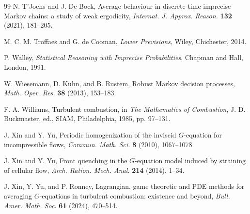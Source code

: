 \documentclass[11pt,reqno,noamsfonts]{amsart}
\theoremstyle{definition}
\theoremstyle{remark}
\begin{document}
\begin{thebibliography}{99}
N. T'Joens and J. De Bock,
Average behaviour in discrete time imprecise Markov chains: a study of weak ergodicity,
\emph{Internat. J. Approx. Reason.} \textbf{132} (2021), 181--205.

M. C. M. Troffaes and G. de Cooman,
\emph{Lower Previsions}, Wiley, Chichester, 2014.

P. Walley,
\emph{Statistical Reasoning with Imprecise Probabilities}, Chapman and Hall, London, 1991.

W. Wiesemann, D. Kuhn, and B. Rustem,
Robust Markov decision processes,
\emph{Math. Oper. Res.} \textbf{38} (2013), 153--183.

F. A. Williams,
Turbulent combustion,
in \emph{The Mathematics of Combustion}, J. D. Buckmaster, ed., SIAM, Philadelphia, 1985, pp. 97--131.

J. Xin and Y. Yu,
Periodic homogenization of the inviscid $G$-equation for incompressible flows,
\emph{Commun. Math. Sci.} \textbf{8} (2010), 1067--1078.

J. Xin and Y. Yu,
Front quenching in the $G$-equation model induced by straining of cellular flow,
\emph{Arch. Ration. Mech. Anal.} \textbf{214} (2014), 1--34.

J. Xin, Y. Yu, and P. Ronney,
Lagrangian, game theoretic and PDE methods for averaging $G$-equations in turbulent combustion: existence and beyond,
\emph{Bull. Amer. Math. Soc.} \textbf{61} (2024), 470--514.

\end{thebibliography}
\end{document}
